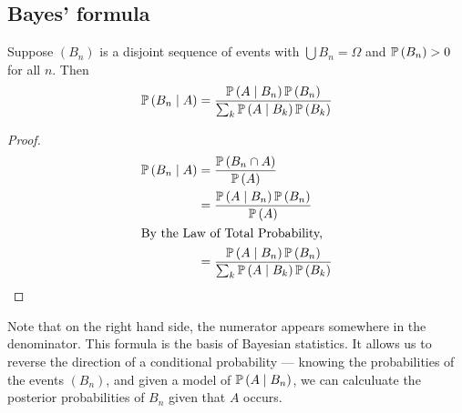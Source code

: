 \subsection{Bayes' formula}
\begin{claim}
	Suppose \((B_n)\) is a disjoint sequence of events with \(\bigcup B_n = \Omega\) and \(\mathbb{P}\left({B_n}\right) > 0\) for all \(n\).
	Then
	\[
		\mathbb{P}\left({B_n \mid A}\right) = \frac{\mathbb{P}\left({A \mid B_n}\right) \mathbb{P}\left({B_n}\right)}{\sum_k \mathbb{P}\left({A \mid B_k}\right) \mathbb{P}\left({B_k}\right)}
	\]
\end{claim}
\begin{proof}
	\begin{align*}
		\mathbb{P}\left({B_n \mid A}\right) & = \frac{\mathbb{P}\left({B_n \cap A}\right)}{\mathbb{P}\left({A}\right)}                                       \\
		                  & = \frac{\mathbb{P}\left({A \mid B_n}\right) \mathbb{P}\left({B_n}\right)}{\mathbb{P}\left({A}\right)}                            \\
		\intertext{By the Law of Total Probability,}
		                  & = \frac{\mathbb{P}\left({A \mid B_n}\right) \mathbb{P}\left({B_n}\right)}{\sum_k \mathbb{P}\left({A \mid B_k}\right) \mathbb{P}\left({B_k}\right)}
	\end{align*}
\end{proof}
\noindent Note that on the right hand side, the numerator appears somewhere in the denominator.
This formula is the basis of Bayesian statistics.
It allows us to reverse the direction of a conditional probability --- knowing the probabilities of the events \((B_n)\), and given a model of \(\mathbb{P}\left({A \mid B_n}\right)\), we can calculuate the posterior probabilities of \(B_n\) given that \(A\) occurs.
